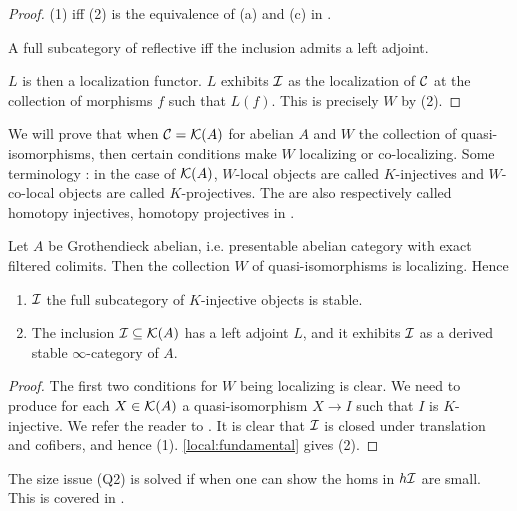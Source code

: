 \documentclass{article}
\begin{document}
\begin{proof}
  (1) iff (2) is the equivalence of (a) and (c)
  in \cite[\href{https://kerodon.net/tag/05Z2}{Tag 05Z2}]{kerodon}.

  A full subcategory of reflective iff the inclusion 
  admits a left adjoint.\cite[\href{https://kerodon.net/tag/02FA}{Tag 02FA}]{kerodon}

  $L$ is then a localization functor.
  \cite[\href{https://kerodon.net/tag/04JL}{Tag 04JL}]{kerodon}
  $L$ exhibits $\mathcal{I}$ as the localization of $\mathcal{C}$ at
  the collection of morphisms $f$ such that $L(f)$.
  \cite[\href{https://kerodon.net/tag/04JH}{Tag 04JH}]{kerodon}
  This is precisely $W$ by (2).
\end{proof}

We will prove that when $\mathcal{C} = \mathcal{K}(A)$ for abelian $A$ 
and $W$ the collection of quasi-isomorphisms,
then certain conditions make $W$ localizing or co-localizing.
Some terminology : in the case of $\mathcal{K}(A)$,
$W$-local objects are called $K$-injectives 
and $W$-co-local objects are called $K$-projectives.
\cite[\href{https://stacks.math.columbia.edu/tag/070G}{Tag 070G}]{stacks-project}
The are also respectively called homotopy injectives,
homotopy projectives in \cite[Section 14.3]{KS06}.

\begin{prop}
  Let $A$ be Grothendieck abelian,
  i.e. presentable abelian category with exact filtered colimits.
  Then the collection $W$ of quasi-isomorphisms is localizing.
  Hence \begin{enumerate}
    \item $\mathcal{I}$ the full subcategory of
    $K$-injective objects is stable.
    \item The inclusion $\mathcal{I} \subseteq \mathcal{K}(A)$ has a left adjoint
    $L$, and it exhibits $\mathcal{I}$ as a derived stable $\infty$-category of $A$.
  \end{enumerate}
\end{prop}
\begin{proof}
  The first two conditions for $W$ being localizing is clear.
  We need to produce for each $X \in \mathcal{K}(A)$
  a quasi-isomorphism $X \to I$ such that $I$ is $K$-injective.
  We refer the reader to \cite[Theorem 14.3.1]{KS06}.
  It is clear that $\mathcal{I}$ is closed under translation
  and cofibers, and hence (1).
  \ref{local:fundamental} gives (2).
\end{proof}
The size issue (Q2) is solved if when one can show
the homs in $h \mathcal{I}$ are small.
This is covered in \cite[Prop. 1.3.5.14]{lurie-HA}.
\end{document}
